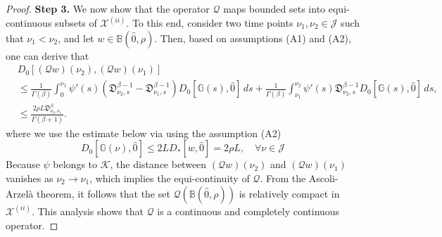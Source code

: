 \documentclass[10pt,a4paper]{amsart}
\numberwithin{equation}{section}
\begin{document}
\begin{proof}
\noindent\textbf{Step 3.} 
We now show that the operator $\mathcal{Q}$ maps bounded sets into equi-continuous 
subsets of $\mathcal{X}^{(ii)}$. To this end, consider two time points 
$\nu _1, \nu _2 \in \mathcal{J}$ such that $\nu _1 < \nu _2$, and let 
$ w \in \mathbb{B}(\hat{0}, \rho)$. Then, based on assumptions (A1) and 
(A2), one can derive that
\begin{align*}
&D_0[(\mathcal{Q} w)(\nu _{2}),(\mathcal{Q} w)(\nu _{1})] \\
&\leq \frac{1}{\Gamma(\beta)} \int_0^{\nu _{1}} \psi'(s)
 (\mathfrak{D}_{\nu _{2},s}^{\beta-1}-\mathfrak{D}_{\nu _{1},s}^{\beta-1}) 
 D_0[\mathbb{G}(s), \hat{0}]\,ds
 +\frac{1}{\Gamma(\beta)} \int_{\nu _{1}}^{\nu _{2}} \psi'(s)
 \mathfrak{D}_{\nu _{2},s}^{\beta-1} D_0[\mathbb{G}(s), \hat{0}]\,ds, \\
& \leq \frac{2 \rho L\mathfrak{D}_{\nu _{2},\nu _{1}}^{\beta}}{\Gamma(\beta+1)}.
\end{align*}
where we use the estimate below via using the assumption (A2)
\begin{equation}\label{eq33}
D_0[\mathbb{G}(\nu ), \hat{0}] \leq 2 L D_{*}[ w, \hat{0}]
=2 \rho L, \quad \forall \nu \in\mathcal{J} 
\end{equation}
Because $\psi$ belongs to $\mathcal{K}$, the distance between 
$(\mathcal{Q} w)(\nu _2)$ and $(\mathcal{Q} w)(\nu _1)$ vanishes as
$\nu _2 \to \nu _1$, which implies the equi-continuity of $\mathcal{Q}$. 
From the Ascoli-Arzelà theorem, it follows that the set 
$\mathcal{Q}(\mathbb{B}(\hat{0}, \rho))$ is relatively compact in 
$\mathcal{X}^{(ii)}$. This analysis shows that $\mathcal{Q}$ is a continuous and 
completely continuous operator.
\smallskip


\end{proof}
\end{document}
